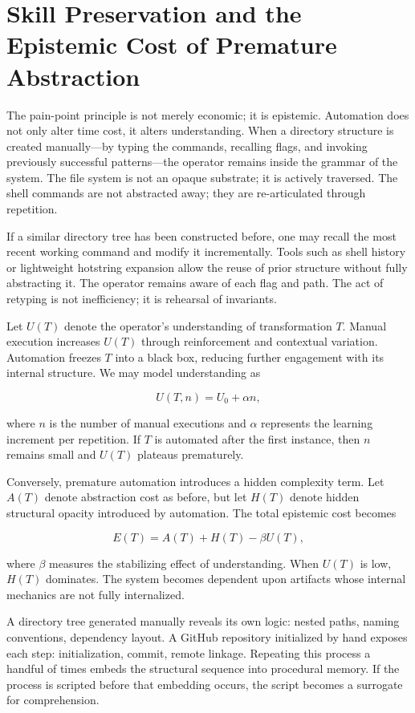 \documentclass[12pt]{article}
\begin{document}
\section{Skill Preservation and the Epistemic Cost of Premature Abstraction}

The pain-point principle is not merely economic; it is epistemic. Automation does not only alter time cost, it alters understanding. When a directory structure is created manually—by typing the commands, recalling flags, and invoking previously successful patterns—the operator remains inside the grammar of the system. The file system is not an opaque substrate; it is actively traversed. The shell commands are not abstracted away; they are re-articulated through repetition.

If a similar directory tree has been constructed before, one may recall the most recent working command and modify it incrementally. Tools such as shell history or lightweight hotstring expansion allow the reuse of prior structure without fully abstracting it. The operator remains aware of each flag and path. The act of retyping is not inefficiency; it is rehearsal of invariants.

Let $U(T)$ denote the operator’s understanding of transformation $T$. Manual execution increases $U(T)$ through reinforcement and contextual variation. Automation freezes $T$ into a black box, reducing further engagement with its internal structure. We may model understanding as

\[
U(T, n) = U_0 + \alpha n,
\]

where $n$ is the number of manual executions and $\alpha$ represents the learning increment per repetition. If $T$ is automated after the first instance, then $n$ remains small and $U(T)$ plateaus prematurely.

Conversely, premature automation introduces a hidden complexity term. Let $A(T)$ denote abstraction cost as before, but let $H(T)$ denote hidden structural opacity introduced by automation. The total epistemic cost becomes

\[
E(T) = A(T) + H(T) - \beta U(T),
\]

where $\beta$ measures the stabilizing effect of understanding. When $U(T)$ is low, $H(T)$ dominates. The system becomes dependent upon artifacts whose internal mechanics are not fully internalized.

A directory tree generated manually reveals its own logic: nested paths, naming conventions, dependency layout. A GitHub repository initialized by hand exposes each step: initialization, commit, remote linkage. Repeating this process a handful of times embeds the structural sequence into procedural memory. If the process is scripted before that embedding occurs, the script becomes a surrogate for comprehension.
\end{document}
